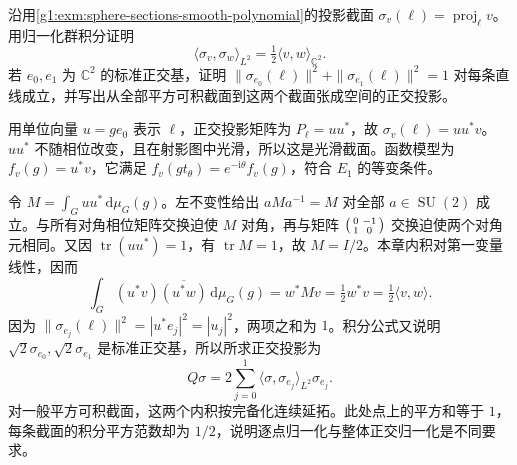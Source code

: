 \begin{exercise}\label{g1:ex:tautological-projection-sections}
	沿用\cref{g1:exm:sphere-sections-smooth-polynomial}的投影截面 \(\sigma_v(\ell)=\operatorname{proj}_\ell v\)。用归一化群积分证明
	\[
		\langle\sigma_v,\sigma_w\rangle_{L^2}
		=\tfrac12\langle v,w\rangle_{\mathbb C^2}.
	\]
	若 \(e_0,e_1\) 为 \(\mathbb C^2\) 的标准正交基，证明 \(\|\sigma_{e_0}(\ell)\|^2+\|\sigma_{e_1}(\ell)\|^2=1\) 对每条直线成立，并写出从全部平方可积截面到这两个截面张成空间的正交投影。
\end{exercise}
\begin{solution}
	用单位向量 \(u=ge_0\) 表示 \(\ell\)，正交投影矩阵为 \(P_\ell=uu^*\)，故 \(\sigma_v(\ell)=uu^*v\)。\(uu^*\) 不随相位改变，且在射影图中光滑，所以这是光滑截面。函数模型为 \(f_v(g)=u^*v\)，它满足 \(f_v(gt_\theta)=e^{-\mathrm{i}\theta}f_v(g)\)，符合 \(E_1\) 的等变条件。

	令 \(M=\int_G uu^*\,\mathrm{d}\mu_G(g)\)。左不变性给出 \(aMa^{-1}=M\) 对全部 \(a\in\operatorname{SU}(2)\) 成立。与所有对角相位矩阵交换迫使 \(M\) 对角，再与矩阵 \(\begin{psmallmatrix}0&-1\\1&0\end{psmallmatrix}\) 交换迫使两个对角元相同。又因 \(\operatorname{tr}(uu^*)=1\)，有 \(\operatorname{tr}M=1\)，故 \(M=I/2\)。本章内积对第一变量线性，因而
	\[
		\int_G(u^*v)\overline{(u^*w)}\,\mathrm{d}\mu_G(g)
		=w^*Mv=\tfrac12w^*v
		=\tfrac12\langle v,w\rangle.
	\]
	因为 \(\|\sigma_{e_j}(\ell)\|^2=|u^*e_j|^2=|u_j|^2\)，两项之和为 \(1\)。积分公式又说明 \(\sqrt2\sigma_{e_0},\sqrt2\sigma_{e_1}\) 是标准正交基，所以所求正交投影为
	\[
		Q\sigma=2\sum_{j=0}^1\langle\sigma,\sigma_{e_j}\rangle_{L^2}\sigma_{e_j}.
	\]
	对一般平方可积截面，这两个内积按完备化连续延拓。此处点上的平方和等于 \(1\)，每条截面的积分平方范数却为 \(1/2\)，说明逐点归一化与整体正交归一化是不同要求。
\end{solution}

